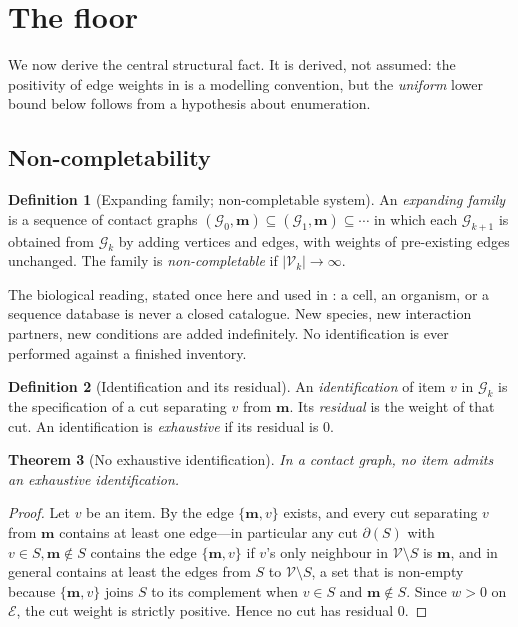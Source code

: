 \documentclass[11pt,twocolumn,a4paper]{article}
\newtheorem{theorem}{Theorem}[section]
\theoremstyle{definition}
\newtheorem{definition}[theorem]{Definition}
\theoremstyle{remark}
\newcommand{\Gph}{\mathcal{G}}
\newcommand{\V}{\mathcal{V}}
\newcommand{\E}{\mathcal{E}}
\newcommand{\med}{\mathbf{m}}
\newcommand{\wt}{w}
\newcommand{\cut}{\partial}
\begin{document}
\section{The floor}
\label{sec:floor}

We now derive the central structural fact. It is derived, not assumed: the
positivity of edge weights in  is a modelling convention, but
the \emph{uniform} lower bound below follows from a hypothesis about
enumeration.

\subsection{Non-completability}

\begin{definition}[Expanding family; non-completable system]
\label{def:expanding}
An \emph{expanding family} is a sequence of contact graphs
$(\Gph_0,\med)\subseteq(\Gph_1,\med)\subseteq\cdots$ in which each
$\Gph_{k+1}$ is obtained from $\Gph_k$ by adding vertices and edges, with
weights of pre-existing edges unchanged. The family is
\emph{non-completable} if $|\V_k|\to\infty$.
\end{definition}

The biological reading, stated once here and used in
: a cell, an organism, or a sequence database is never
a closed catalogue. New species, new interaction partners, new conditions
are added indefinitely. No identification is ever performed against a
finished inventory.

\begin{definition}[Identification and its residual]
\label{def:residual}
An \emph{identification} of item $v$ in $\Gph_k$ is the specification of a
cut separating $v$ from $\med$. Its \emph{residual} is the weight of that
cut. An identification is \emph{exhaustive} if its residual is $0$.
\end{definition}

\begin{theorem}[No exhaustive identification]
\label{thm:noexhaustive}
In a contact graph, no item admits an exhaustive identification.
\end{theorem}

\begin{proof}
Let $v$ be an item. By  the edge $\{\med,v\}$ exists,
and every cut separating $v$ from $\med$ contains at least one edge---in
particular any cut $\cut(S)$ with $v\in S,\med\notin S$ contains the edge
$\{\med,v\}$ if $v$'s only neighbour in $\V\setminus S$ is $\med$, and in
general contains at least the edges from $S$ to $\V\setminus S$, a set
that is non-empty because $\{\med,v\}$ joins $S$ to its complement when
$v \in S$ and $\med \notin S$. Since $\wt>0$ on $\E$, the cut weight is
strictly positive. Hence no cut has residual $0$.
\end{proof}
\end{document}
